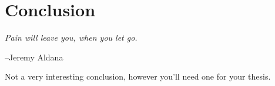 \chapter{Conclusion}\label{ch:conclusion}
\thispagestyle{empty}
\vspace*{\fill}
\epigraph{\emph{Pain will leave you, when you let go.}}
{--Jeremy Aldana}

\clearpage
Not a very interesting conclusion, however you'll need one for your thesis.
